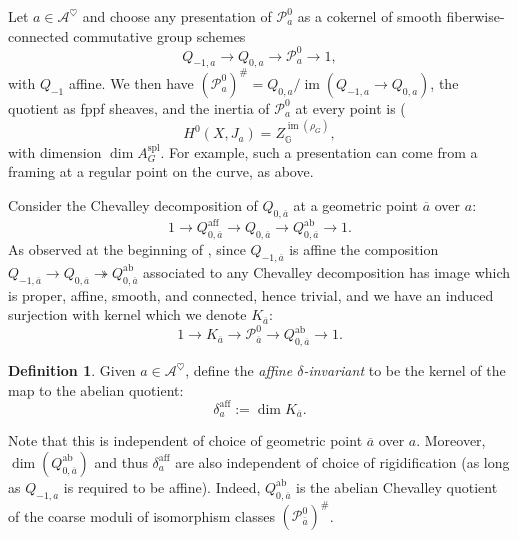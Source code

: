\documentclass[openany]{amsbook}
\theoremstyle{definition}
\newtheorem{definition}[theorem]{Definition}
\theoremstyle{remark}
\numberwithin{equation}{section}
\newcommand{\G}{\mathbb{G}}
\newcommand{\cA}{\mathcal{A}}
\newcommand{\cP}{\mathcal{P}}
\newcommand{\im}{\operatorname{im}}
\newcommand{\ol}[1]{\overline{#1}}
\renewcommand{\-}{\operatorname{-}}
\newcommand{\spl}{\mathrm{spl}}
\newcommand{\aff}{\mathrm{aff}}
\newcommand{\ab}{\mathrm{ab}}
\begin{document}
Let $a \in \cA^{\heartsuit}$ and choose any presentation of $\cP_{a}^0$ as a cokernel of smooth fiberwise-connected commutative group schemes 
$$
    Q_{-1,a} \to Q_{0,a} \to \cP_{a}^0 \to 1,
$$
with $Q_{-1}$ affine. We then have $(\cP_a^0)^\# = Q_{0,a}/\im(Q_{-1,a} \to Q_{0,a})$, the quotient as fppf sheaves, and the inertia of $\cP_{a}^0$ at every point is (\cite[Proposition 4.5.5]{ngofl}
$$
    H^0(X, J_a) = Z_{\G}^{\im(\rho_G)},
$$
with dimension $\dim A_G^{\spl}$. For example, such a presentation can come from a framing at a regular point on the curve, as above. 

Consider the Chevalley decomposition of $Q_{0,\ol{a}}$ at a geometric point $\ol{a}$ over $a$:
$$
    1 \to Q_{0, \ol{a}}^{\aff} \to Q_{0, \ol{a}} \to Q^{\ab}_{0, \ol{a}} \to 1.
$$
As observed at the beginning of \cite[\S 4.12]{ngofl}, since $Q_{-1, \ol{a}}$ is affine the composition $ Q_{-1, \ol{a}} \to Q_{0, \ol{a}} \twoheadrightarrow Q_{0,\ol{a}}^\ab$ associated to any Chevalley decomposition has image which is proper, affine, smooth, and connected, hence trivial, and we have an induced surjection with kernel which we denote $K_{\ol{a}}$:
$$
    1 \to K_{\ol{a}} \to \cP_{\ol{a}}^0 \to Q_{0,\ol{a}}^\ab \to 1.
$$

\begin{definition}\label{def.aff.delta.inv}
    Given $a \in \cA^{\heartsuit}$, define the \emph{affine $\delta$-invariant} to be the kernel of the map to the abelian quotient: $$\delta_a^{\aff} := \dim K_{\ol{a}}.$$
\end{definition}

Note that this is independent of choice of geometric point $\ol{a}$ over $a$. Moreover, $\dim(Q_{0,\ol{a}}^{\ab})$ and thus $\delta_a^{\aff}$ are also independent of choice of rigidification (as long as $Q_{-1,a}$ is required to be affine). Indeed, $Q_{0, \ol{a}}^{\ab}$ is the abelian Chevalley quotient of the coarse moduli of isomorphism classes $(\cP^0_{\ol{a}})^\#$. 
\end{document}
